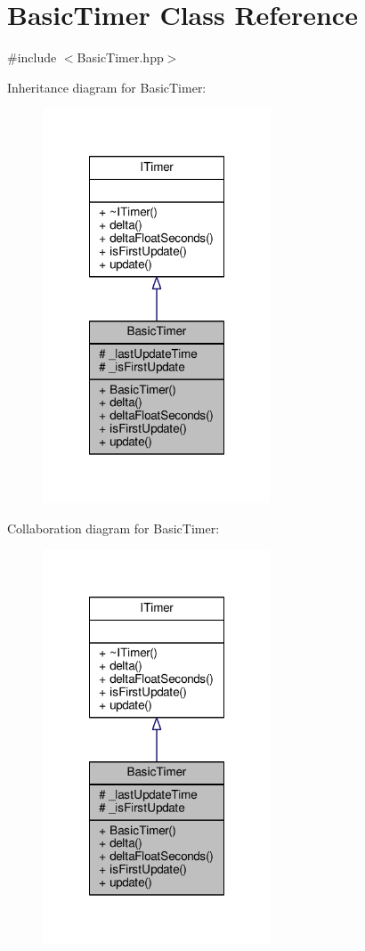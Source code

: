 \hypertarget{class_basic_timer}{\section{Basic\-Timer Class Reference}
\label{class_basic_timer}
}


{\ttfamily \#include $<$Basic\-Timer.\-hpp$>$}



Inheritance diagram for Basic\-Timer\-:
\nopagebreak
\begin{figure}[H]
\begin{center}
\leavevmode
\includegraphics[width=192pt]{class_basic_timer__inherit__graph}
\end{center}
\end{figure}


Collaboration diagram for Basic\-Timer\-:
\nopagebreak
\begin{figure}[H]
\begin{center}
\leavevmode
\includegraphics[width=192pt]{class_basic_timer__coll__graph}
\end{center}
\end{figure}
